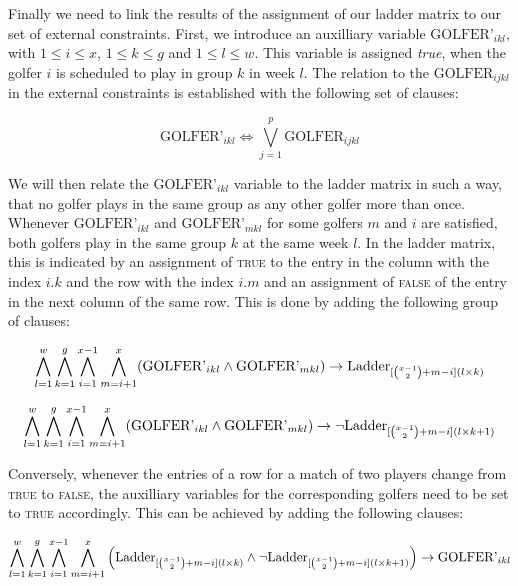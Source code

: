 \documentclass[a4paper]{scrartcl}
\begin{document}
Finally we need to link the results of the assignment of our ladder matrix to our set of external constraints. First, we introduce an auxilliary variable $\text{GOLFER'}_{ikl}$, with $1 \leq i \leq x$, $1 \leq k \leq g$ and $1 \leq l \leq w$. This variable is assigned \emph{true}, when the golfer $i$ is scheduled to play in group $k$ in week $l$. The relation to the $\text{GOLFER}_{ijkl}$ in the external constraints is established with the following set of clauses:

\begin{equation}
    \text{GOLFER'}_{ikl} \iff \bigvee \limits_{j=1}^p \text{GOLFER}_{ijkl}
\end{equation}

We will then relate the $\text{GOLFER'}_{ikl}$ variable to the ladder matrix in such a way, that no golfer plays in the same group as any other golfer more than once. Whenever $\text{GOLFER'}_{ikl}$ and $\text{GOLFER'}_{mkl}$ for some golfers $m$ and $i$ are satisfied, both golfers play in the same group $k$ at the same week $l$. In the ladder matrix, this is indicated by an assignment of \textsc{true} to the entry in the column with the index $i.k$ and the row with the index $i.m$ and an assignment of \textsc{false} of the entry in the next column of the same row. This is done by adding the following group of clauses:

\begin{equation}
\centering
    \bigwedge \limits_{l=1}^{w}
    \bigwedge \limits_{k=1}^{g}
    \bigwedge \limits_{i=1}^{x-1}
    \bigwedge \limits_{m=i+1}^{x}
    (\text{GOLFER'}_{ikl} \wedge \text{GOLFER'}_{mkl}) \to \text{Ladder}_{[{x-1 \choose 2}+m-i](l \times k)}
\end{equation}

\begin{equation}
\centering
    \bigwedge \limits_{l=1}^{w}
    \bigwedge \limits_{k=1}^{g}
    \bigwedge \limits_{i=1}^{x-1}
    \bigwedge \limits_{m=i+1}^{x}
    (\text{GOLFER'}_{ikl} \wedge \text{GOLFER'}_{mkl}) \to \neg \text{Ladder}_{[{x-1 \choose 2}+m-i](l \times k + 1)}
\end{equation}

Conversely, whenever the entries of a row for a match of two players change from \textsc{true} to \textsc{false}, the auxilliary  variables for the corresponding golfers need to be set to \textsc{true} accordingly. This can be achieved by adding the following clauses:

\begin{equation}
\centering
    \bigwedge \limits_{l=1}^{w}
    \bigwedge \limits_{k=1}^{g}
    \bigwedge \limits_{i=1}^{x-1}
    \bigwedge \limits_{m=i+1}^{x}
    \Big(
        \text{Ladder}_{
            [
                {x-1 \choose 2}
                +m-i
            ](l \times k)
        }
        \wedge
        \neg
        \text{Ladder}_{
            [
                {x-1 \choose 2}
                +m-i
            ](l \times k + 1)
        }
    \Big)
    \to
    \text{GOLFER'}_{ikl}
\end{equation}
\end{document}
